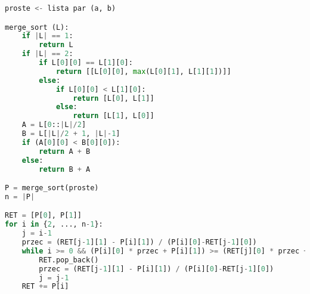 \documentclass{article}
\begin{document}
\begin{lstlisting}[language=Python]
proste <- lista par (a, b)

merge_sort (L):
    if |L| == 1:
        return L
    if |L| == 2:
        if L[0][0] == L[1][0]:
            return [[L[0][0], max(L[0][1], L[1][1])]]
        else:
            if L[0][0] < L[1][0]:
                return [L[0], L[1]]
            else:
                return [L[1], L[0]]
    A = L[0::|L|/2]
    B = L[|L|/2 + 1, |L|-1]
    if (A[0][0] < B[0][0]):
        return A + B
    else:
        return B + A

P = merge_sort(proste)
n = |P|

RET = [P[0], P[1]]
for i in {2, ..., n-1}:
    j = i-1
    przec = (RET[j-1][1] - P[i][1]) / (P[i][0]-RET[j-1][0])
    while i >= 0 && (P[i][0] * przec + P[i][1]) >= (RET[j][0] * przec + RET[j][1]):
        RET.pop_back()
        przec = (RET[j-1][1] - P[i][1]) / (P[i][0]-RET[j-1][0])
        j = j-1
    RET += P[i]

    

\end{lstlisting}
\end{document}
